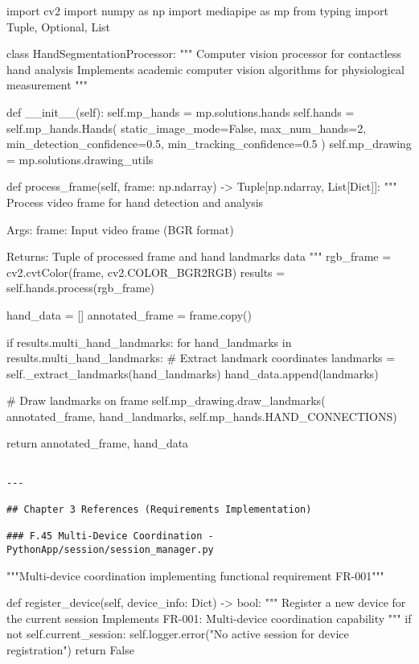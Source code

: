 \documentclass[12pt,a4paper]{report}
\begin{document}
import cv2
import numpy as np
import mediapipe as mp
from typing import Tuple, Optional, List


class HandSegmentationProcessor:
    """
    Computer vision processor for contactless hand analysis
    Implements academic computer vision algorithms for physiological measurement
    """

    def \_\_init\_\_(self):
        self.mp\_hands = mp.solutions.hands
        self.hands = self.mp\_hands.Hands(
            static\_image\_mode=False,
            max\_num\_hands=2,
            min\_detection\_confidence=0.5,
            min\_tracking\_confidence=0.5
        )
        self.mp\_drawing = mp.solutions.drawing\_utils

    def process\_frame(self, frame: np.ndarray) -> Tuple[np.ndarray, List[Dict]]:
        """
        Process video frame for hand detection and analysis
        
        Args:
            frame: Input video frame (BGR format)
            
        Returns:
            Tuple of processed frame and hand landmarks data
        """
        rgb\_frame = cv2.cvtColor(frame, cv2.COLOR\_BGR2RGB)
        results = self.hands.process(rgb\_frame)

        hand\_data = []
        annotated\_frame = frame.copy()

        if results.multi\_hand\_landmarks:
            for hand\_landmarks in results.multi\_hand\_landmarks:
                \# Extract landmark coordinates
                landmarks = self.\_extract\_landmarks(hand\_landmarks)
                hand\_data.append(landmarks)

                \# Draw landmarks on frame
                self.mp\_drawing.draw\_landmarks(
                    annotated\_frame, hand\_landmarks, self.mp\_hands.HAND\_CONNECTIONS)

        return annotated\_frame, hand\_data
\begin{verbatim}

---

## Chapter 3 References (Requirements Implementation)

### F.45 Multi-Device Coordination - PythonApp/session/session_manager.py

\end{verbatim}
"""Multi-device coordination implementing functional requirement FR-001"""


def register\_device(self, device\_info: Dict) -> bool:
    """
    Register a new device for the current session
    Implements FR-001: Multi-device coordination capability
    """
    if not self.current\_session:
        self.logger.error("No active session for device registration")
        return False
\end{document}
